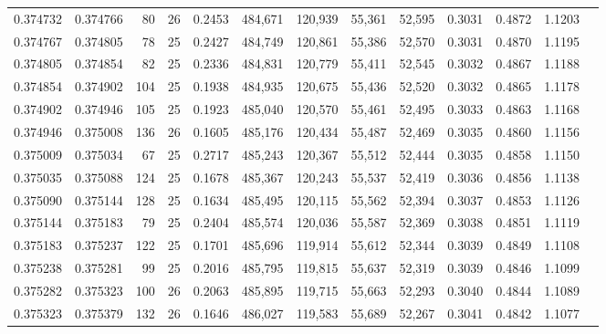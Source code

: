 \begin{tabular}{rrrrrrrrrrrrr}
0.374732 & 0.374766 &    80 &  26 &                                     0.2453 & 484,671 & 120,939 &  55,361 &  52,595 & 0.3031 & 0.4872 & 1.1203 \\
0.374767 & 0.374805 &    78 &  25 &                                     0.2427 & 484,749 & 120,861 &  55,386 &  52,570 & 0.3031 & 0.4870 & 1.1195 \\
0.374805 & 0.374854 &    82 &  25 &                                     0.2336 & 484,831 & 120,779 &  55,411 &  52,545 & 0.3032 & 0.4867 & 1.1188 \\
0.374854 & 0.374902 &   104 &  25 &                                     0.1938 & 484,935 & 120,675 &  55,436 &  52,520 & 0.3032 & 0.4865 & 1.1178 \\
0.374902 & 0.374946 &   105 &  25 &                                     0.1923 & 485,040 & 120,570 &  55,461 &  52,495 & 0.3033 & 0.4863 & 1.1168 \\
0.374946 & 0.375008 &   136 &  26 &                                     0.1605 & 485,176 & 120,434 &  55,487 &  52,469 & 0.3035 & 0.4860 & 1.1156 \\
0.375009 & 0.375034 &    67 &  25 &                                     0.2717 & 485,243 & 120,367 &  55,512 &  52,444 & 0.3035 & 0.4858 & 1.1150 \\
0.375035 & 0.375088 &   124 &  25 &                                     0.1678 & 485,367 & 120,243 &  55,537 &  52,419 & 0.3036 & 0.4856 & 1.1138 \\
0.375090 & 0.375144 &   128 &  25 &                                     0.1634 & 485,495 & 120,115 &  55,562 &  52,394 & 0.3037 & 0.4853 & 1.1126 \\
0.375144 & 0.375183 &    79 &  25 &                                     0.2404 & 485,574 & 120,036 &  55,587 &  52,369 & 0.3038 & 0.4851 & 1.1119 \\
0.375183 & 0.375237 &   122 &  25 &                                     0.1701 & 485,696 & 119,914 &  55,612 &  52,344 & 0.3039 & 0.4849 & 1.1108 \\
0.375238 & 0.375281 &    99 &  25 &                                     0.2016 & 485,795 & 119,815 &  55,637 &  52,319 & 0.3039 & 0.4846 & 1.1099 \\
0.375282 & 0.375323 &   100 &  26 &                                     0.2063 & 485,895 & 119,715 &  55,663 &  52,293 & 0.3040 & 0.4844 & 1.1089 \\
0.375323 & 0.375379 &   132 &  26 &                                     0.1646 & 486,027 & 119,583 &  55,689 &  52,267 & 0.3041 & 0.4842 & 1.1077 \\

\end{tabular}
